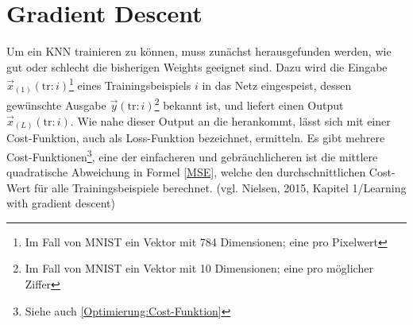 \documentclass[a4paper,12pt,ngerman,oneside]{scrreprt}	%
\newcommand{\practitioner}[1]{(vgl. Gibson \& Patterson, 2017, S. {#1})}
\begin{document}
	
	
		\section{Gradient Descent}\label{GradientDescent}
			Um ein KNN trainieren zu können, muss zunächst herausgefunden werden, wie gut oder schlecht die bisherigen Weights geeignet sind. Dazu wird die Eingabe \mbox{$\vec{x}_{(1)}(\textrm{tr}:i)$}\footnote{Im Fall von MNIST ein Vektor mit 784 Dimensionen; eine pro Pixelwert} eines Trainingsbeispiels $i$ in das Netz eingespeist, dessen gewünschte Ausgabe \mbox{$\vec{y}(\textrm{tr}:i)$}\footnote{Im Fall von MNIST ein Vektor mit 10 Dimensionen; eine pro möglicher Ziffer} bekannt ist, und liefert einen Output \mbox{$\vec{x}_{(L)}(\textrm{tr}:i)$}. Wie nahe dieser Output an die  herankommt, lässt sich mit einer Cost-Funktion, auch als Loss-Funktion bezeichnet, ermitteln. Es gibt mehrere Cost-Funktionen\footnote{Siehe auch \ref{Optimierung:Cost-Funktion}}, eine der einfacheren und gebräuchlicheren ist die mittlere quadratische Abweichung in Formel \ref{MSE}, welche den durchschnittlichen Cost-Wert für alle Trainingsbeispiele berechnet. (vgl. Nielsen, 2015, Kapitel 1/Learning with gradient descent) 
			
\end{document}
